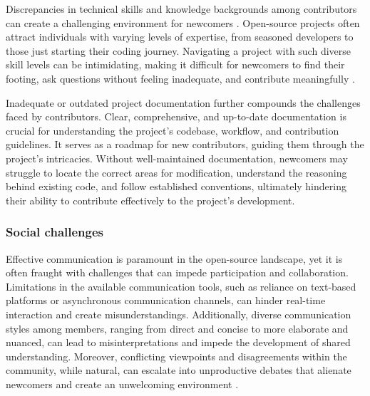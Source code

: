 Discrepancies in technical skills and knowledge backgrounds among contributors can create a challenging environment for newcomers \citep{01steinmacher2015systematic,04guizani2021long}. Open-source projects often attract individuals with varying levels of expertise, from seasoned developers to those just starting their coding journey. Navigating a project with such diverse skill levels can be intimidating, making it difficult for newcomers to find their footing, ask questions without feeling inadequate, and contribute meaningfully \citep{14hannebauer2017relationship}.

Inadequate or outdated project documentation further compounds the challenges faced by contributors. Clear, comprehensive, and up-to-date documentation is crucial for understanding the project's codebase, workflow, and contribution guidelines. It serves as a roadmap for new contributors, guiding them through the project's intricacies. Without well-maintained documentation, newcomers may struggle to locate the correct areas for modification, understand the reasoning behind existing code, and follow established conventions, ultimately hindering their ability to contribute effectively to the project's development.



\subsubsection{Social challenges}

Effective communication is paramount in the open-source landscape, yet it is often fraught with challenges that can impede participation and collaboration. Limitations in the available communication tools, such as reliance on text-based platforms or asynchronous communication channels, can hinder real-time interaction and create misunderstandings. Additionally, diverse communication styles among members, ranging from direct and concise to more elaborate and nuanced, can lead to misinterpretations and impede the development of shared understanding. Moreover, conflicting viewpoints and disagreements within the community, while natural, can escalate into unproductive debates that alienate newcomers and create an unwelcoming environment \citep{02steinmacher2015social}.

